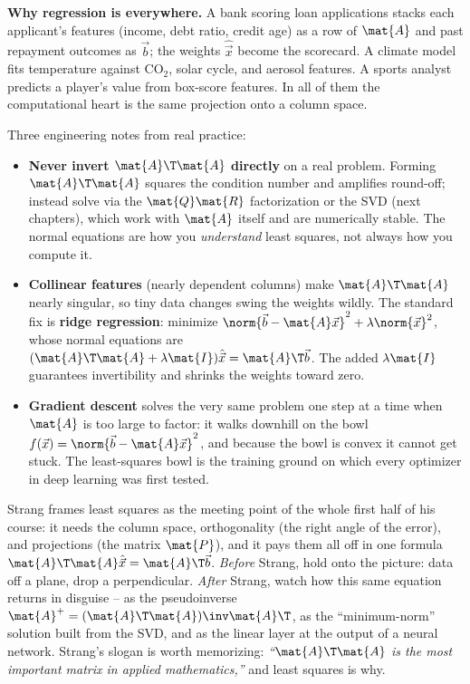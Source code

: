 \begin{applicationbox}
\textbf{Why regression is everywhere.} A bank scoring loan applications stacks each applicant's
features (income, debt ratio, credit age) as a row of $\mat{A}$ and past repayment outcomes as
$\vec{b}$; the weights $\hat{\vec{x}}$ become the scorecard. A climate model fits temperature
against $\mathrm{CO}_2$, solar cycle, and aerosol features. A sports analyst predicts a player's
value from box-score features. In all of them the computational heart is the same projection onto
a column space.

Three engineering notes from real practice:
\begin{itemize}
  \item \textbf{Never invert $\mat{A}\T\mat{A}$ directly} on a real problem. Forming
  $\mat{A}\T\mat{A}$ squares the condition number and amplifies round-off; instead solve via the
  $\mat{Q}\mat{R}$ factorization or the SVD (next chapters), which work with $\mat{A}$ itself and
  are numerically stable. The normal equations are how you \emph{understand} least squares, not
  always how you compute it.
  \item \textbf{Collinear features} (nearly dependent columns) make $\mat{A}\T\mat{A}$ nearly
  singular, so tiny data changes swing the weights wildly. The standard fix is \textbf{ridge
  regression}: minimize $\norm{\vec{b}-\mat{A}\vec{x}}^2 + \lambda\norm{\vec{x}}^2$, whose normal
  equations are $(\mat{A}\T\mat{A}+\lambda\mat{I})\hat{\vec{x}}=\mat{A}\T\vec{b}$. The added
  $\lambda\mat{I}$ guarantees invertibility and shrinks the weights toward zero.
  \item \textbf{Gradient descent} solves the very same problem one step at a time when $\mat{A}$ is
  too large to factor: it walks downhill on the bowl $f(\vec{x})=\norm{\vec{b}-\mat{A}\vec{x}}^2$,
  and because the bowl is convex it cannot get stuck. The least-squares bowl is the training ground
  on which every optimizer in deep learning was first tested.
\end{itemize}
\end{applicationbox}

\begin{strangbox}
Strang frames least squares as the meeting point of the whole first half of his course: it needs
the column space, orthogonality (the right angle of the error), and projections (the matrix
$\mat{P}$), and it pays them all off in one formula
$\mat{A}\T\mat{A}\hat{\vec{x}}=\mat{A}\T\vec{b}$. \emph{Before} Strang, hold onto the picture:
data off a plane, drop a perpendicular. \emph{After} Strang, watch how this same equation returns
in disguise -- as the pseudoinverse $\mat{A}^{+}=(\mat{A}\T\mat{A})\inv\mat{A}\T$, as the
``minimum-norm'' solution built from the SVD, and as the linear layer at the output of a neural
network. Strang's slogan is worth memorizing: \emph{``$\mat{A}\T\mat{A}$ is the most important
matrix in applied mathematics,''} and least squares is why.
\end{strangbox}

